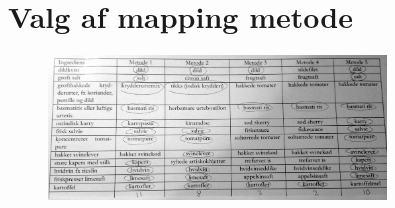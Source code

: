 \chapter{Valg af mapping metode}
\label{ap:valgafmappingmetode}

\begin{figure}
\centering
\includegraphics[width=0.8\textwidth]{billeder/valgafmappingmetode.jpg}
\end{figure}
